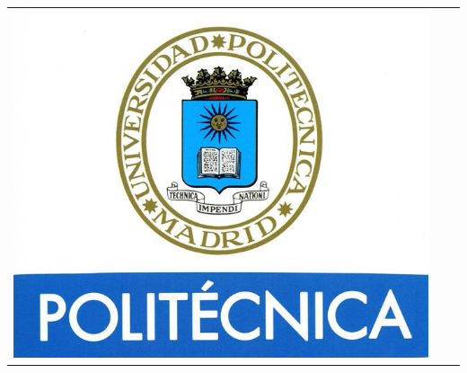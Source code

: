 \documentclass[final]{beamer}
\newlength{\onecolwid}
\begin{document}
\begin{frame}[t]
\begin{columns}[t]
\begin{column}{\onecolwid}
\begin{center}
\begin{tabular}{ccc}
\includegraphics[width=0.4\linewidth]{logoUPM.jpg} 
\end{tabular}
\end{center}


\end{column} %

\end{columns} %

\end{frame} %
\end{document}
